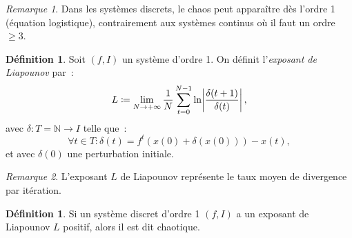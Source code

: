 \documentclass{article}
\theoremstyle{definition}
\newtheorem{déf}[thm]{Définition}
\theoremstyle{remark}
\newtheorem*{rmq}{Remarque}
\newcommand{\N}{\mathbb N}
\begin{document}
	\begin{rmq} Dans les systèmes discrets, le chaos peut apparaître dès l'ordre 1 (équation logistique), contrairement aux systèmes continus où il faut un
	ordre $\geq 3$.
	\end{rmq}

	\begin{déf} Soit $(f, I)$ un système d'ordre 1. On définit l'\textit{exposant de Liapounov} par~:
	\[L \coloneqq \lim_{N \to +\infty}\frac 1N\sum_{t=0}^{N-1}\ln \abs {\frac {\delta(t+1)}{\delta(t)}},\]
	avec $\delta : T = \N \to I$ telle que~:
	\[\forall t \in T : \delta(t) = f^t\left(x(0) + \delta(x(0))\right) - x(t),\]
	et avec $\delta(0)$ une perturbation initiale.
	\end{déf}

	\begin{rmq} L'exposant $L$ de Liapounov représente le taux moyen de divergence par itération.
	\end{rmq}

	\begin{déf} Si un système discret d'ordre 1 $(f, I)$ a un exposant de Liapounov $L$ positif, alors il est dit chaotique.
	\end{déf}
\end{document}
